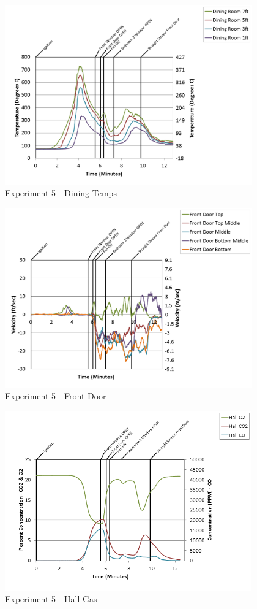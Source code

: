 \documentclass{article}
\begin{document}
\begin{appendices}
\begin{figure}[h!]
	\centering
	\includegraphics[height=3.05in]{0_Images/Results_Charts/Exp_5_Charts/DiningTemps.png}
	\caption{Experiment 5 - Dining Temps}
\end{figure}

\clearpage

\begin{figure}[h!]
	\centering
	\includegraphics[height=3.05in]{0_Images/Results_Charts/Exp_5_Charts/FrontDoor.png}
	\caption{Experiment 5 - Front Door}
\end{figure}


\begin{figure}[h!]
	\centering
	\includegraphics[height=3.05in]{0_Images/Results_Charts/Exp_5_Charts/HallGas.png}
	\caption{Experiment 5 - Hall Gas}
\end{figure}


\end{appendices}
\end{document}
